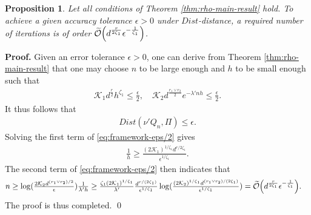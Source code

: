 \documentclass[12pt]{article}
\numberwithin{equation}{section}
\renewenvironment{proof}%
  {\begin{trivlist}%
   \item[]\ignorespaces}%
  {\qed\end{trivlist}}
\newtheorem{prop}{Proposition}[section]
\begin{document}
\begin{prop} \label{prop:rho-mixing-time}
    Let all conditions of Theorem \ref{thm:rho-main-result} hold. To achieve a given accuracy tolerance $ \epsilon > 0$ under $\textit{Dist}$-distance, a required number of iterations is of order $\widetilde{\mathcal{O}}\Bigl(d^{\frac{r}{2\zeta_1}}\epsilon^{-\frac{1}{\zeta_1}}\Bigr)$.
\end{prop}

\begin{proof}
    \textbf{Proof.}
    Given an error tolerance $\epsilon >0$, one can derive from Theorem \ref{thm:rho-main-result} that one may choose $n$ to be large enough and $h$ to be small enough such that
    \begin{align}\label{eq:framework-eps/2}
        \mathcal{K}_1d^{\frac{r}{2}}h^{\zeta_1} \leq \tfrac{\epsilon}{2}, \quad \mathcal{K}_2d^{\frac{r_1\vee r_2}{2}}e^{-\lambda' n h} \leq \tfrac{\epsilon}{2}.
    \end{align}
    It thus follows that 
    \begin{align}
        \textit{Dist}(\nu' Q_n, \Pi) \leq \epsilon.
    \end{align}
    Solving the first term of \eqref{eq:framework-eps/2} gives
    \begin{align}
        \tfrac{1}{h} \geq \tfrac{(2\mathcal{K}_1)^{1/\zeta_1}d^{r/2\zeta_1}}{\epsilon^{1/\zeta_1}}.
    \end{align}
    The second term of \eqref{eq:framework-eps/2} then indicates that
    \begin{align}
        n &\geq 
        \log (\tfrac{2\mathcal{K}_2d^{(r_1\vee r_2)/2}}{\epsilon})\tfrac{1}{\lambda' h} 
        \geq \tfrac{\zeta_1(2\mathcal{K}_1)^{1/\zeta_1}}{\lambda'}\tfrac{d^{r/(2\zeta_1)}}{\epsilon^{1/\zeta_1}}
        \log (\tfrac{(2\mathcal{K}_2)^{1/\zeta_1}d^{(r_1\vee r_2)/(2\zeta_1)}}{\epsilon^{1/\zeta_1}}) 
        = \widetilde{\mathcal{O}}\Bigl(d^{\frac{r}{2\zeta_1}}\epsilon^{-\frac{1}{\zeta_1}}\Bigr).
    \end{align}
    The proof is thus completed.
\end{proof}






\end{document}
